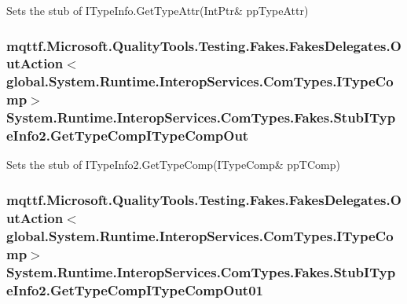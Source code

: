 Sets the stub of I\-Type\-Info.\-Get\-Type\-Attr(Int\-Ptr\& pp\-Type\-Attr)

\hypertarget{class_system_1_1_runtime_1_1_interop_services_1_1_com_types_1_1_fakes_1_1_stub_i_type_info2_adba3cf186ce911493bd9761ed5d210c3}{
\subsubsection[{Get\-Type\-Comp\-I\-Type\-Comp\-Out}]{\setlength{\rightskip}{0pt plus 5cm}mqttf.\-Microsoft.\-Quality\-Tools.\-Testing.\-Fakes.\-Fakes\-Delegates.\-Out\-Action$<$global.\-System.\-Runtime.\-Interop\-Services.\-Com\-Types.\-I\-Type\-Comp$>$ System.\-Runtime.\-Interop\-Services.\-Com\-Types.\-Fakes.\-Stub\-I\-Type\-Info2.\-Get\-Type\-Comp\-I\-Type\-Comp\-Out}}\label{class_system_1_1_runtime_1_1_interop_services_1_1_com_types_1_1_fakes_1_1_stub_i_type_info2_adba3cf186ce911493bd9761ed5d210c3}


Sets the stub of I\-Type\-Info2.\-Get\-Type\-Comp(I\-Type\-Comp\& pp\-T\-Comp)

\hypertarget{class_system_1_1_runtime_1_1_interop_services_1_1_com_types_1_1_fakes_1_1_stub_i_type_info2_a319bedd5159ea8d0b06458d27924cff7}{
\subsubsection[{Get\-Type\-Comp\-I\-Type\-Comp\-Out01}]{\setlength{\rightskip}{0pt plus 5cm}mqttf.\-Microsoft.\-Quality\-Tools.\-Testing.\-Fakes.\-Fakes\-Delegates.\-Out\-Action$<$global.\-System.\-Runtime.\-Interop\-Services.\-Com\-Types.\-I\-Type\-Comp$>$ System.\-Runtime.\-Interop\-Services.\-Com\-Types.\-Fakes.\-Stub\-I\-Type\-Info2.\-Get\-Type\-Comp\-I\-Type\-Comp\-Out01}}\label{class_system_1_1_runtime_1_1_interop_services_1_1_com_types_1_1_fakes_1_1_stub_i_type_info2_a319bedd5159ea8d0b06458d27924cff7}


